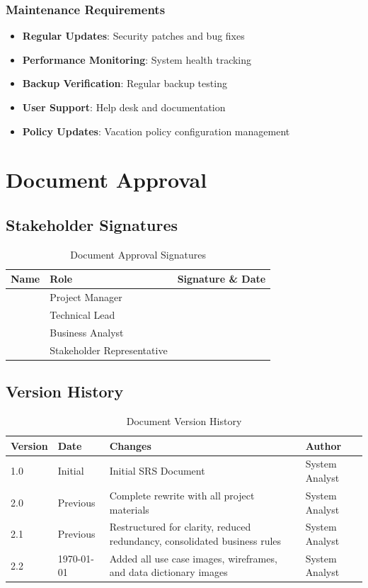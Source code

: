 \documentclass[12pt,a4paper]{article}
\begin{document}
\subsubsection{Maintenance Requirements}
\begin{itemize}
    \item \textbf{Regular Updates}: Security patches and bug fixes
    \item \textbf{Performance Monitoring}: System health tracking
    \item \textbf{Backup Verification}: Regular backup testing
    \item \textbf{User Support}: Help desk and documentation
    \item \textbf{Policy Updates}: Vacation policy configuration management
\end{itemize}

\section{Document Approval}

\subsection{Stakeholder Signatures}
\begin{table}[H]
\centering
\begin{tabular}{|p{4cm}|p{4cm}|p{4cm}|}
\hline
\textbf{Name} & \textbf{Role} & \textbf{Signature \& Date} \\
\hline
 & Project Manager &  \\
\hline
 & Technical Lead &  \\
\hline
 & Business Analyst &  \\
\hline
 & Stakeholder Representative &  \\
\hline
\end{tabular}
\caption{Document Approval Signatures}
\end{table}

\subsection{Version History}
\begin{table}[H]
\centering
\begin{tabular}{|p{2cm}|p{3cm}|p{4cm}|p{3cm}|}
\hline
\textbf{Version} & \textbf{Date} & \textbf{Changes} & \textbf{Author} \\
\hline
1.0 & Initial & Initial SRS Document & System Analyst \\
\hline
2.0 & Previous & Complete rewrite with all project materials & System Analyst \\
\hline
2.1 & Previous & Restructured for clarity, reduced redundancy, consolidated business rules & System Analyst \\
\hline
2.2 & \today & Added all use case images, wireframes, and data dictionary images & System Analyst \\
\hline
\end{tabular}
\caption{Document Version History}
\end{table}
\end{document}
